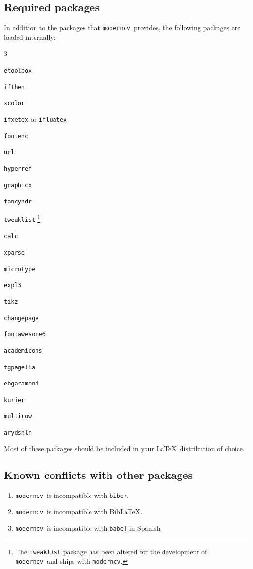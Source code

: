 \documentclass[a4paper, 11pt]{article}
\newcommand{\code}[1]{\lstinline!#1!}
\newcommand{\moderncv}{\code{moderncv}}
\newcommand{\Moderncv}{\moderncv~}
\newcommand{\Latex}{\LaTeX~}
\newcommand{\biblatex}{BibLaTeX}
\begin{document}
\subsection{Required packages}
\label{section:implementationDetails:requiredPackages}
In addition to the packages that \Moderncv provides, the following packages are loaded internally:
\begin{itemize}
  \begin{multicols}{3}
    \item \code{etoolbox}
    \item \code{ifthen}
    \item \code{xcolor}
    \item \code{ifxetex} or \code{ifluatex}
    \item \code{fontenc}
    \item \code{url}
    \item \code{hyperref}
    \item \code{graphicx}
    \item \code{fancyhdr}
    \item \code{tweaklist}%
    \footnote{The \code{tweaklist} package has been altered for the development of \Moderncv and ships with \moderncv.}
    \item \code{calc}
    \item \code{xparse}
    \item \code{microtype}
    \item \code{expl3}
    \item \code{tikz}
    \item \code{changepage}
    \item \code{fontawesome6}
    \item \code{academicons}
    \item \code{tgpagella}
    \item \code{ebgaramond}
    \item \code{kurier}
    \item \code{multirow}
    \item \code{arydshln}
  \end{multicols}
\end{itemize}

Most of these packages should be included in your \Latex distribution of choice.

\subsection{Known conflicts with other packages}
\begin{enumerate}
  \item \Moderncv is incompatible with \code{biber}.
  \item \Moderncv is incompatible with \biblatex.
  \item \Moderncv is incompatible with \code{babel} in Spanish
\end{enumerate}
\end{document}

